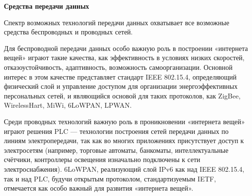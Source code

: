  \begin{center}{\bfseries Средства передачи данных}
  \end{center}

  Спектр возможных технологий передачи данных охватывает все возможные средства беспроводных и проводных сетей.

  Для беспроводной передачи данных особо важную роль в построении «интернета вещей» играют такие качества, как эффективность в условиях низких скоростей, отказоустойчивость, адаптивность, возможность самоорганизации. Основной интерес в этом качестве представляет стандарт IEEE 802.15.4, определяющий физический слой и управление доступом для организации энергоэффективных персональных сетей, и являющийся основой для таких протоколов, как ZigBee, WirelessHart, MiWi, 6LoWPAN, LPWAN.

  Среди проводных технологий важную роль в проникновении «интернета вещей» играют решения PLC — технологии построения сетей передачи данных по линиям электропередачи, так как во многих приложениях присутствует доступ к электросетям (например, торговые автоматы, банкоматы, интеллектуальные счётчики, контроллеры освещения изначально подключены к сети электроснабжения). 6LoWPAN, реализующий слой IPv6 как над IEEE 802.15.4, так и над PLC, будучи открытым протоколом, стандартизуемым IETF, отмечается как особо важный для развития «интернета вещей».

  